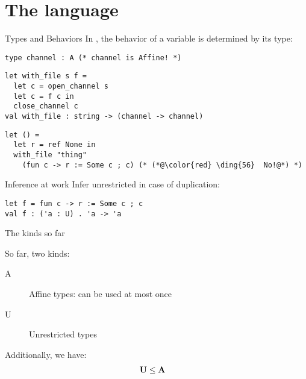\documentclass[xcolor=svgnames,11pt]{beamer}
\begin{document}
\section{The \lang language}

\begin{frame}[fragile]{Types and Behaviors}
  In \lang, the behavior of a variable is determined
  by its type:
\begin{lstlisting}
type channel : A (* channel is Affine! *)
\end{lstlisting}\pause
\begin{lstlisting}
let with_file s f =
  let c = open_channel s
  let c = f c in
  close_channel c
val with_file : string -> (channel -> channel)
\end{lstlisting}\pause
\begin{lstlisting}
let () =
  let r = ref None in
  with_file "thing"
    (fun c -> r := Some c ; c) (* (*@\color{red} \ding{56}  No!@*) *)
\end{lstlisting}
\end{frame}

\begin{frame}[fragile]{Inference at work}
  Infer unrestricted in case of duplication:
\begin{lstlisting}
let f = fun c -> r := Some c ; c
val f : ('a : U) . 'a -> 'a
\end{lstlisting}
\end{frame}

\begin{frame}{The kinds so far}

  So far, two kinds:
  \begin{description}
  \item[A] Affine types: can be used at most once
  \item[U] Unrestricted types
  \end{description}

  Additionally, we have:
  \begin{align*}
    \mathbf{U} &\leq \mathbf{A}
  \end{align*}
\end{frame}

\end{document}
